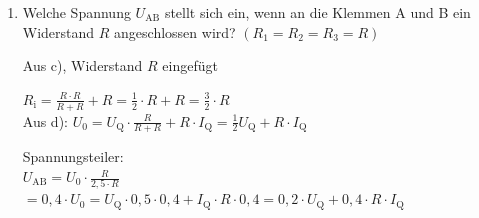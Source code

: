 {\begin {enumerate}[label=\alph*)]
        $ R_\mathrm{i} = R_\mathrm{i,AB}= R_3 + \frac{R_1 \cdot R_2}{R_1 + R_2}$\\

        $\rightarrow I_\mathrm{K} = \frac{U_0}{R_\mathrm{i}}= \frac{U_\mathrm{Q}\cdot R_2 + I_\mathrm{Q} \cdot R_3 \cdot (R_1+R_2)}{R_1 \cdot R_2 + R_3 \cdot (R_1+R_2)} $






        \item Welche Spannung $U_{\mathrm{AB}}$ stellt sich ein, wenn an die Klemmen A und B ein Widerstand $R$ angeschlossen wird? $(R_1 = R_2 = R_3 = R)$    
    

    Aus c), Widerstand $R$ eingefügt
    \begin{center}
        
    \end{center}
    $R_\mathrm{i} = \frac{R \cdot R}{R + R} + R= \frac{1}{2} \cdot R + R = \frac{3}{2} \cdot R$\\

    Aus d): $U_0 = U_\mathrm{Q} \cdot \frac{R}{R+R} + R \cdot I_\mathrm{Q} = \frac{1}{2} U_\mathrm{Q} + R \cdot I_\mathrm{Q}$

    Spannungsteiler:\\
    
    $U_\mathrm{AB} = U_0 \cdot \frac{R}{2,5 \cdot R}$\\

    $ = 0,4 \cdot U_0 = U_\mathrm{Q} \cdot 0,5 \cdot 0,4 + I_\mathrm{Q} \cdot R \cdot 0,4 = 0,2 \cdot U_\mathrm{Q} + 0,4 \cdot R \cdot I_\mathrm{Q}$




    \end{enumerate}

}